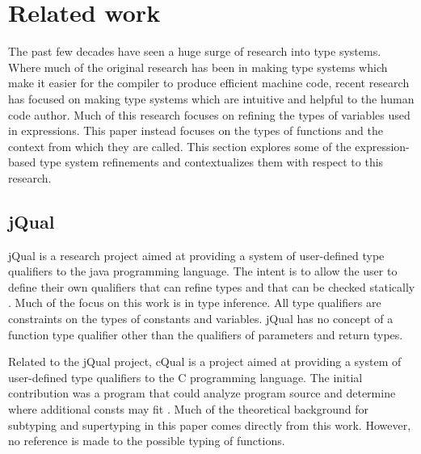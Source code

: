 \chapter{Related work}\label{sec:related}

The past few decades have seen a huge surge of research into type systems.  Where much of the original research has been in making type systems which make it easier for the compiler to produce efficient machine code, recent research has focused on making type systems which are intuitive and helpful to the human code author.  Much of this research focuses on refining the types of variables used in expressions.  This paper instead focuses on the types of functions and the context from which they are called.  This section explores some of the expression-based type system refinements and contextualizes them with respect to this research.

\section{jQual}

jQual is a research project aimed at providing a system of user-defined type qualifiers to the java programming language.  The intent is to allow the user to define their own qualifiers that can refine types and that can be checked statically \cite{jqual-inference, jqual-qualify}.  Much of the focus on this work is in type inference.  All type qualifiers are constraints on the types of constants and variables.  jQual has no concept of a function type qualifier other than the qualifiers of parameters and return types.  

Related to the jQual project, cQual is a project aimed at providing a system of user-defined type qualifiers to the C programming language.  The initial contribution was a program that could analyze program source and determine where additional consts may fit \cite{theory-of-qual}.  Much of the theoretical background for subtyping and supertyping in this paper comes directly from this work.  However, no reference is made to the possible typing of functions.  
